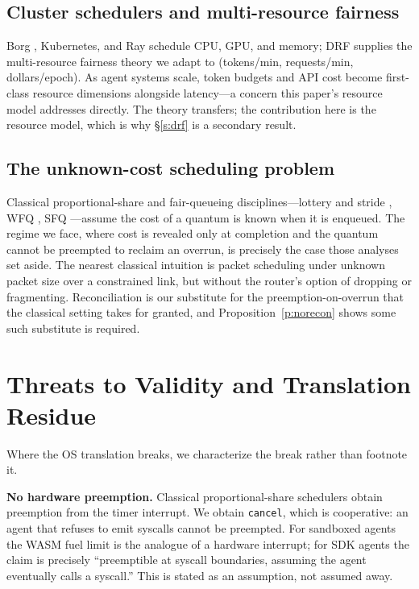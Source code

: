 \documentclass[letterpaper,11pt,leqno]{article}
\begin{document}
\subsection{Cluster schedulers and multi-resource fairness}\label{s:rel-cluster}

Borg \citep{Verma15}, Kubernetes, and Ray \citep{Moritz18} schedule CPU, GPU, and memory; DRF \citep{Ghodsi11} supplies the multi-resource fairness theory we adapt to (tokens/min, requests/min, dollars/epoch). As agent systems scale, token budgets and API cost become first-class resource dimensions alongside latency---a concern this paper's resource model addresses directly. The theory transfers; the contribution here is the resource model, which is why \S\ref{s:drf} is a secondary result.

\subsection{The unknown-cost scheduling problem}\label{s:rel-unknown}

Classical proportional-share and fair-queueing disciplines---lottery and stride \citep{Waldspurger94, Waldspurger95}, WFQ \citep{Demers89}, SFQ \citep{Goyal96}---assume the cost of a quantum is known when it is enqueued. The regime we face, where cost is revealed only at completion and the quantum cannot be preempted to reclaim an overrun, is precisely the case those analyses set aside. The nearest classical intuition is packet scheduling under unknown packet size over a constrained link, but without the router's option of dropping or fragmenting. Reconciliation is our substitute for the preemption-on-overrun that the classical setting takes for granted, and Proposition~\ref{p:norecon} shows some such substitute is required.

\section{Threats to Validity and Translation Residue}\label{s:threats}

Where the OS translation breaks, we characterize the break rather than footnote it.

\textbf{No hardware preemption.} Classical proportional-share schedulers obtain preemption from the timer interrupt. We obtain \texttt{cancel}, which is cooperative: an agent that refuses to emit syscalls cannot be preempted. For sandboxed agents the WASM fuel limit is the analogue of a hardware interrupt; for SDK agents the claim is precisely ``preemptible at syscall boundaries, assuming the agent eventually calls a syscall.'' This is stated as an assumption, not assumed away.
\end{document}
